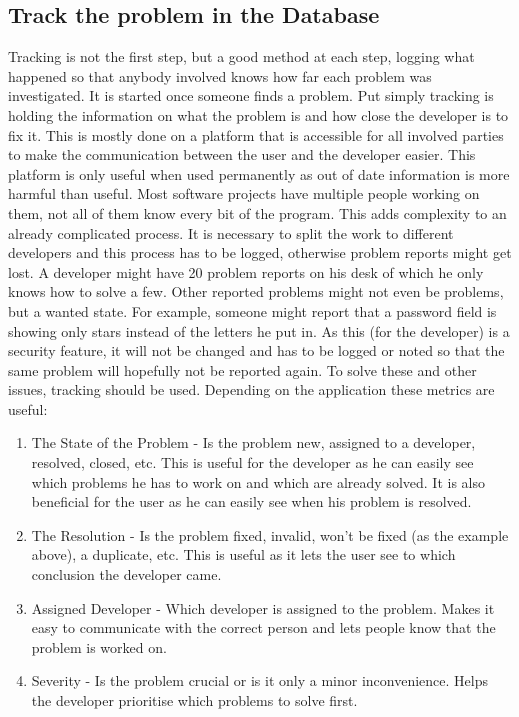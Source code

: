 \subsection{Track the problem in the Database}
\label{aodZellerTrack}
Tracking is not the first step, but a good method at each step, logging what happened so that anybody involved knows how far each problem was investigated. It is started once someone finds a problem. Put simply tracking is holding the information on what the problem is and how close the developer is to fix it. This is mostly done on a platform that is accessible for all involved parties to make the communication between the user and the developer easier. This platform is only useful when used permanently as out of date information is more harmful than useful. Most software projects have multiple people working on them, not all of them know every bit of the program. This adds complexity to an already complicated process. It is necessary to split the work to different developers and this process has to be logged, otherwise problem reports might get lost. A developer might have 20 problem reports on his desk of which he only knows how to solve a few. Other reported problems might not even be problems, but a wanted state. For example, someone might report that a password field is showing only stars instead of the letters he put in. As this (for the developer) is a security feature, it will not be changed and has to be logged or noted so that the same problem will hopefully not be reported again. To solve these and other issues, tracking should be used. Depending on the application these metrics are useful:
\begin{enumerate}
  \item The State of the Problem - Is the problem new, assigned to a developer,
resolved, closed, etc. This is useful for the developer as he can easily see which problems he has to work on and which are already solved. It is also beneficial for the user as he can easily see when his problem is resolved.
  \item The Resolution - Is the problem fixed, invalid, won't be fixed (as the example above), a duplicate, etc. This is useful as it lets the user see to which conclusion the developer came.
  \item Assigned Developer -  Which developer is assigned to the problem. Makes it easy to communicate with the correct person and lets people know that the problem is worked on.
  \item Severity - Is the problem crucial or is it only a minor inconvenience. Helps the developer prioritise which problems to solve first.
\end{enumerate}

